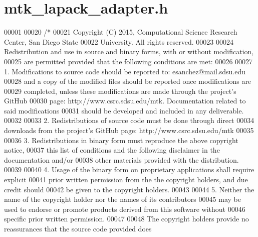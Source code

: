 \hypertarget{mtk__lapack__adapter_8h_source}{\section{mtk\+\_\+lapack\+\_\+adapter.\+h}
\label{mtk__lapack__adapter_8h_source}
}

\begin{DoxyCode}
00001 
00020 \textcolor{comment}{/*}
00021 \textcolor{comment}{Copyright (C) 2015, Computational Science Research Center, San Diego State}
00022 \textcolor{comment}{University. All rights reserved.}
00023 \textcolor{comment}{}
00024 \textcolor{comment}{Redistribution and use in source and binary forms, with or without modification,}
00025 \textcolor{comment}{are permitted provided that the following conditions are met:}
00026 \textcolor{comment}{}
00027 \textcolor{comment}{1. Modifications to source code should be reported to: esanchez@mail.sdsu.edu}
00028 \textcolor{comment}{and a copy of the modified files should be reported once modifications are}
00029 \textcolor{comment}{completed, unless these modifications are made through the project's GitHub}
00030 \textcolor{comment}{page: http://www.csrc.sdsu.edu/mtk. Documentation related to said modifications}
00031 \textcolor{comment}{should be developed and included in any deliverable.}
00032 \textcolor{comment}{}
00033 \textcolor{comment}{2. Redistributions of source code must be done through direct}
00034 \textcolor{comment}{downloads from the project's GitHub page: http://www.csrc.sdsu.edu/mtk}
00035 \textcolor{comment}{}
00036 \textcolor{comment}{3. Redistributions in binary form must reproduce the above copyright notice,}
00037 \textcolor{comment}{this list of conditions and the following disclaimer in the documentation and/or}
00038 \textcolor{comment}{other materials provided with the distribution.}
00039 \textcolor{comment}{}
00040 \textcolor{comment}{4. Usage of the binary form on proprietary applications shall require explicit}
00041 \textcolor{comment}{prior written permission from the the copyright holders, and due credit should}
00042 \textcolor{comment}{be given to the copyright holders.}
00043 \textcolor{comment}{}
00044 \textcolor{comment}{5. Neither the name of the copyright holder nor the names of its contributors}
00045 \textcolor{comment}{may be used to endorse or promote products derived from this software without}
00046 \textcolor{comment}{specific prior written permission.}
00047 \textcolor{comment}{}
00048 \textcolor{comment}{The copyright holders provide no reassurances that the source code provided does}

\end{DoxyCode}
